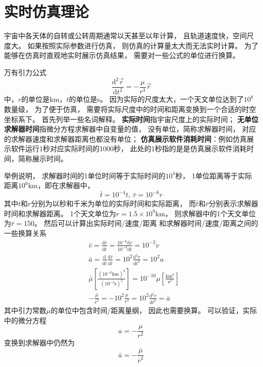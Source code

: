\section{实时仿真理论}
宇宙中各天体的自转或公转周期通常以天甚至以年计算，
且轨道速度快，空间尺度大。
如果按照实际参数进行仿真，
则仿真的计算量太大而无法实时计算。
为了能够在仿真时直观地实时展示仿真结果，
需要对一些公式的单位进行换算。

万有引力公式
\begin{equation*}
    \frac{\text{d}^2\vec{r}}{\text{d}t^2}=-\frac{\mu}{r^3}\vec{r}
\end{equation*}
中，$r$的单位是km，$t$的单位是s。
因为实际的尺度太大，一个天文单位达到了$10^8$数量级，
为了便于仿真，
需要将实际尺度中的时间和距离变换到一个合适的时空坐标系下。
首先列举一些名词解释。
\textbf{实际时间}指宇宙尺度上的实际时间；
\textbf{无单位求解器时间}指微分方程求解器中自变量的值，
没有单位，简称求解器时间，
对应的求解器速度和求解器距离也都没有单位；
\textbf{仿真展示软件消耗时间}：例如仿真展示软件运行1秒对应实际时间的1000秒，
此处的1秒指的是是仿真展示软件消耗时间，简称展示时间。

举例说明，
求解器时间的1单位时间等于实际时间的$10^4$秒，
1单位距离等于实际距离$10^6$km，即在求解器中，
\begin{equation}
    \bar{t}=10^{-4}t,\ \bar{r}=10^{-6}r \label{eqRealConvert}
\end{equation}
其中$t$和$r$分别为以秒和千米为单位的实际时间和实际距离，
而$\bar{t}$和$\bar{r}$分别表示求解器时间和求解器距离。
1个天文单位为$r=1.5\times10^8$km，
则求解器中的1个天文单位为$\bar{r}=150$。
然后可以计算出实际时间/速度/距离
和求解器时间/速度/距离之间的一些换算关系
\begin{align*}
    &\bar{v} = \frac{\text{d}\bar{r}}{\text{d}\bar{t}}
     = \frac{10^{-6}\text{d}r}{10^{-4}\text{d}t} = 10^{-2}v \\
    &\bar{a} = \frac{\text{d}}{\text{d}\bar{t}}\frac{\text{d}\bar{r}}{\text{d}\bar{t}}
     = 10^2\frac{\text{d}^2r}{\text{d}t^2} = 10^2a \\
    &\bar{\mu}\left[\frac{(10^{-6}\text{km})^3}{(10^{-4}\text{s})^2}\right]
     = 10^{-10}\mu\left[\frac{\text{km}^3}{\text{s}^2}\right] \\
    &-\frac{\bar{\mu}}{\bar{r}^2} = -10^2\frac{\mu}{r^2}
     = 10^2\frac{\text{d}^2r}{\text{d}t^2} = \bar{a}
    \end{align*}
    其中引力常数$\mu$的单位中包含时间/距离量纲，
因此也需要换算。
可以验证，实际中的微分方程
$$a=-\frac{\mu}{r^2}$$
变换到求解器中仍然为
$$\bar{a}=-\frac{\bar{\mu}}{\bar{r}^2}$$

